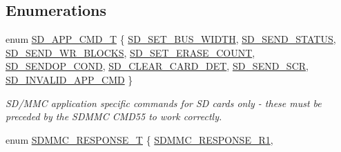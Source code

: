 \subsection*{Enumerations}
\begin{DoxyCompactItemize}
\item 
enum \hyperlink{group___c_h_i_p___s_d_m_m_c___definitions_ga1bf27ef97c5e846aa2b0f8372583502a}{S\+D\+\_\+\+A\+P\+P\+\_\+\+C\+M\+D\+\_\+T} \{ \newline
\hyperlink{group___c_h_i_p___s_d_m_m_c___definitions_gga1bf27ef97c5e846aa2b0f8372583502aaaa0038e9c8f98145f38b12340aea391b}{S\+D\+\_\+\+S\+E\+T\+\_\+\+B\+U\+S\+\_\+\+W\+I\+D\+TH}, 
\hyperlink{group___c_h_i_p___s_d_m_m_c___definitions_gga1bf27ef97c5e846aa2b0f8372583502aad822462692847b4e8433157cd75eef70}{S\+D\+\_\+\+S\+E\+N\+D\+\_\+\+S\+T\+A\+T\+US}, 
\hyperlink{group___c_h_i_p___s_d_m_m_c___definitions_gga1bf27ef97c5e846aa2b0f8372583502aa54a07cc39daab1e8f3cfd67b84f2d2ee}{S\+D\+\_\+\+S\+E\+N\+D\+\_\+\+W\+R\+\_\+\+B\+L\+O\+C\+KS}, 
\hyperlink{group___c_h_i_p___s_d_m_m_c___definitions_gga1bf27ef97c5e846aa2b0f8372583502aaa59870a4a4a750b54215771d5407e6a0}{S\+D\+\_\+\+S\+E\+T\+\_\+\+E\+R\+A\+S\+E\+\_\+\+C\+O\+U\+NT}, 
\newline
\hyperlink{group___c_h_i_p___s_d_m_m_c___definitions_gga1bf27ef97c5e846aa2b0f8372583502aa5f7d878965af172c8192cca62aeb7313}{S\+D\+\_\+\+S\+E\+N\+D\+O\+P\+\_\+\+C\+O\+ND}, 
\hyperlink{group___c_h_i_p___s_d_m_m_c___definitions_gga1bf27ef97c5e846aa2b0f8372583502aa04e3e526208c964726f6dc1efa5d19a8}{S\+D\+\_\+\+C\+L\+E\+A\+R\+\_\+\+C\+A\+R\+D\+\_\+\+D\+ET}, 
\hyperlink{group___c_h_i_p___s_d_m_m_c___definitions_gga1bf27ef97c5e846aa2b0f8372583502aa153691d96f3863634920ab18f44df392}{S\+D\+\_\+\+S\+E\+N\+D\+\_\+\+S\+CR}, 
\hyperlink{group___c_h_i_p___s_d_m_m_c___definitions_gga1bf27ef97c5e846aa2b0f8372583502aa63d407edc96d69c1b0cf700c5ba9837e}{S\+D\+\_\+\+I\+N\+V\+A\+L\+I\+D\+\_\+\+A\+P\+P\+\_\+\+C\+MD}
 \}\begin{DoxyCompactList}\small\item\em S\+D/\+M\+MC application specific commands for SD cards only -\/ these must be preceded by the S\+D\+M\+MC C\+M\+D55 to work correctly. \end{DoxyCompactList}
\item 
enum \hyperlink{group___c_h_i_p___s_d_m_m_c___definitions_ga3c7486874b09a91a717cc43d090c4faa}{S\+D\+M\+M\+C\+\_\+\+R\+E\+S\+P\+O\+N\+S\+E\+\_\+T} \{ \newline
\hyperlink{group___c_h_i_p___s_d_m_m_c___definitions_gga3c7486874b09a91a717cc43d090c4faaa2c7ba4101960d1eed6164e90deff2837}{S\+D\+M\+M\+C\+\_\+\+R\+E\+S\+P\+O\+N\+S\+E\+\_\+\+R1}, 

\end{DoxyCompactItemize}
